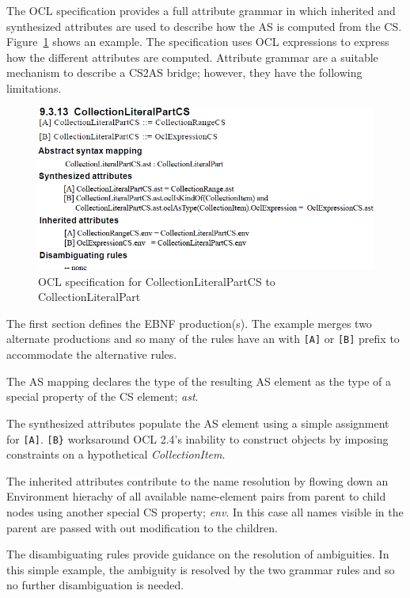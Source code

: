 \documentclass{llncs}
\begin{document}
The OCL specification provides a full attribute grammar in which inherited and synthesized attributes are used to describe how the AS is computed from the CS. Figure~\ref{fig:CollectionLiteralPartOMG} shows an example. The specification uses OCL expressions to express how the different attributes are computed. Attribute grammar are a suitable mechanism to describe a CS2AS bridge; however, they have the following limitations. 

\begin{figure}[htbp]
\centering
\includegraphics[scale=0.45]{images/CollectionLiteralPartOMG.png}
\caption{OCL specification for CollectionLiteralPartCS to CollectionLiteralPart}
\label{fig:CollectionLiteralPartOMG}
\end{figure}
The first section defines the EBNF production(s). The example merges two alternate productions and so many of the rules have an with \verb$[A]$ or \verb$[B]$ prefix to accommodate the alternative rules.

The AS mapping declares the type of the resulting AS element as the type of a special property of the CS element; \emph{ast}.

The synthesized attributes populate the AS element using a simple assignment for \verb$[A]$. \verb$[B}$ worksaround OCL 2.4's inability to construct objects by imposing constraints on a hypothetical \emph{CollectionItem}.

The inherited attributes contribute to the name resolution by flowing down an Environment hierachy of all available name-element pairs from parent to child nodes using another special CS property; \emph{env}. In this case all names visible in the parent are passed with out modification to the children.

The disambiguating rules provide guidance on the resolution of ambiguities. In this simple example, the ambiguity is resolved by the two grammar rules and so no further disambiguation is needed.
\end{document}

